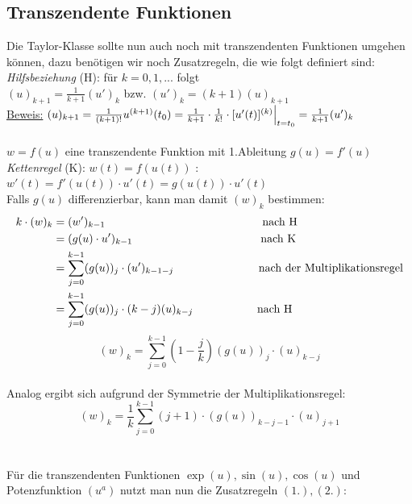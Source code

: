 \documentclass{scrartcl}
\begin{document}
\subsection{Transzendente Funktionen}
Die Taylor-Klasse sollte nun auch noch mit transzendenten Funktionen umgehen können, dazu benötigen wir noch Zusatzregeln, die wie folgt definiert sind:\\
\textit{Hilfsbeziehung} (H): für $k=0,1, ...$ folgt \\
$(u)_{k+1} = \frac{1}{k +1}(u')_k$ bzw. $(u')_k = (k+1)(u)_{k+1}$ \\
\hspace*{0.5cm}\underline{Beweis:} $(u)_{k+1}=\frac{1}{(k+1)!}u^{(k+1)}(t_0) = \frac{1}{k+1}\cdot \frac{1}{k!}\cdot [u'(t)]^{(k)}\Big{|}_{t=t_0} = \frac{1}{k+1}(u')_k $\\
\\
$w = f(u)$ eine transzendente Funktion mit  1.Ableitung $g(u) = f'(u)$\\
\textit{Kettenregel} (K): $w(t) = f(u(t))$ : $w'(t) = f'(u(t)) \cdot u'(t) = g(u(t)) \cdot u'(t)$\\
Falls $g(u)$ differenzierbar, kann man damit $(w)_k$ bestimmen:\\
\begin{align*}k\cdot (w)_k &= (w')_{k-1} \hspace*{4.9cm}\text{nach H}\\
 &= (g(u)\cdot u')_{k-1}\hspace*{4cm}\text{nach K}\\
 &= \sum_{j=0}^{k-1}(g(u))_j\cdot (u')_{k-1-j}\hspace*{2.65cm}\text{nach der Multiplikationsregel}\\
 &= \sum_{j=0}^{k-1} (g(u))_j\cdot (k-j)(u)_{k-j}\hspace*{2cm}\text{nach H}\end{align*}
\begin{equation}\tag{1.}(w)_k = \sum_{j=0}^{k-1} (1-\frac{j}{k})(g(u))_j\cdot (u)_{k-j}\end{equation}\\
Analog ergibt sich aufgrund der Symmetrie der Multiplikationsregel: \\
\begin{equation}\tag{2.}(w)_k = \frac{1}{k}\sum_{j=0}^{k-1} (j+1)\cdot(g(u))_{k-j-1}\cdot (u)_{j+1}\end{equation} \\
\\
Für die transzendenten Funktionen $\exp(u), \sin(u), \cos(u)$ und Potenzfunktion $(u^a)$ nutzt man nun die Zusatzregeln $(1.),(2.)$:
\end{document}
